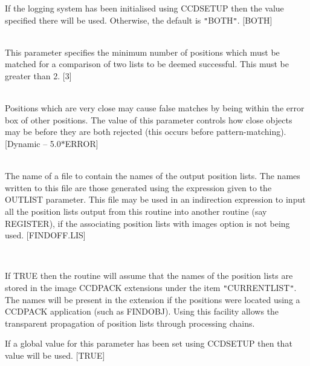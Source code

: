\documentclass[twoside,11pt]{article}
\newcommand{\htmlref}[2]{#1}
\renewcommand{\_}{\texttt{\symbol{95}}}
\newcommand{\qt}[1]{{\tt "}#1{\tt "}}
\newcommand{\xroutine}[1]{\htmlref{{\sc #1}}{#1}}
\newcommand{\sstsubsection}[1]{ \item[{#1}] \mbox{} \\}
\newcommand{\sstsubsection}[1]{\item[{#1}]}
\begin{document}
{{{{         }
         If the logging system has been initialised using \xroutine{CCDSETUP}
         then the value specified there will be used. Otherwise, the
         default is \qt{BOTH}.
         [BOTH]
      }
      \sstsubsection{
         MINMATCH = \_INTEGER (Read)
      } {
         This parameter specifies the minimum number of positions
         which must be matched for a comparison of two lists to be
         deemed successful. This must be greater than 2.
         [3]
      }
      \sstsubsection{
         MINSEP = \_DOUBLE (Read)
      } {
         Positions which are very close may cause false matches by being
         within the error box of other positions. The value of this
         parameter controls how close objects may be before they are
         both rejected (this occurs before pattern-matching).
         [Dynamic -- 5.0$*$ERROR]
      }
      \sstsubsection{
         NAMELIST = LITERAL (Read)
      } {
         The name of a file to contain the names of the output
         position lists. The names written to this file are those
         generated using the expression given to the OUTLIST parameter.
         This file may be used in an indirection expression to input
         all the position lists output from this routine into another
         routine (say \xroutine{REGISTER}), if the associating position lists with
         images option is not being used.
         [FINDOFF.LIS]
      }
      \sstsubsection{
         NDFNAMES = \_LOGICAL (Read)
      } {
         If TRUE then the routine will assume that the names of the
         position lists are stored in the image CCDPACK extensions under
         the item \qt{CURRENT\_LIST}. The names will be present in the
         extension if the positions were located using a CCDPACK
         application (such as \xroutine{FINDOBJ}). Using this facility allows the
         transparent propagation of position lists through processing
         chains.

         If a global value for this parameter has been set using
         \xroutine{CCDSETUP} then that value will be used.
         [TRUE]
      }

}}
\end{document}
